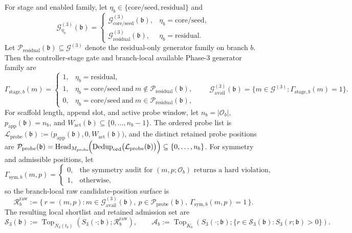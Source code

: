 \documentclass[11pt]{article}
\begin{document}
For stage and enabled family, let \(\eta_b\in\{\mathrm{core/seed},\mathrm{residual}\}\) and
\[
\mathcal G_{\eta_b}^{(3)}(\mathfrak b)=
\begin{cases}
\mathcal G_{\mathrm{core/seed}}^{(3)}(\mathfrak b),&\eta_b=\mathrm{core/seed},\\
\mathcal G_{\mathrm{residual}}^{(3)}(\mathfrak b),&\eta_b=\mathrm{residual}.
\end{cases}
\]
Let \(\mathcal P_{\mathrm{residual}}(\mathfrak b)\subseteq\mathcal G^{(3)}\) denote the residual-only generator family on branch \(b\). Then the controller-stage gate and branch-local available Phase-3 generator family are
\[
\Gamma_{\mathrm{stage},b}(m)=
\begin{cases}
1,&\eta_b=\mathrm{residual},\\
1,&\eta_b=\mathrm{core/seed}\ \text{and}\ m\notin\mathcal P_{\mathrm{residual}}(\mathfrak b),\\
0,&\eta_b=\mathrm{core/seed}\ \text{and}\ m\in\mathcal P_{\mathrm{residual}}(\mathfrak b),
\end{cases}
\qquad
\mathcal G_{\mathrm{avail}}^{(3)}(\mathfrak b)=\{m\in\mathcal G^{(3)}:\Gamma_{\mathrm{stage},b}(m)=1\}.
\]
For scaffold length, append slot, and active probe window, let \(n_b=|\mathcal O_b|\), \(p_{\mathrm{app}}(\mathfrak b)=n_b\), and \(W_{\mathrm{act}}(\mathfrak b)\subseteq\{0,\dots,n_b-1\}\). The ordered probe list is \(\mathcal L_{\mathrm{probe}}(\mathfrak b):=\bigl(p_{\mathrm{app}}(\mathfrak b),0,W_{\mathrm{act}}(\mathfrak b)\bigr)\), and the distinct retained probe positions are \(\mathcal P_{\mathrm{probe}}(\mathfrak b)=\operatorname{Head}_{M_{\mathrm{probe}}}\!\Bigl(\operatorname{Dedup}_{\mathrm{ord}}\bigl(\mathcal L_{\mathrm{probe}}(\mathfrak b)\bigr)\Bigr)\subseteq\{0,\dots,n_b\}\). For symmetry and admissible positions, let
\[
\Gamma_{\mathrm{sym},b}(m,p)=
\begin{cases}
0,&\text{the symmetry audit for }(m,p;\mathcal O_b)\text{ returns a hard violation},\\
1,&\text{otherwise},
\end{cases}
\]
so the branch-local raw candidate-position surface is
\[
\mathcal R_b^{\mathrm{raw}}
:=
\{\,r=(m,p):m\in\mathcal G_{\mathrm{avail}}^{(3)}(\mathfrak b),\ p\in\mathcal P_{\mathrm{probe}}(\mathfrak b),\ \Gamma_{\mathrm{sym},b}(m,p)=1\,\}.
\]
The resulting local shortlist and retained admission set are
\[
\mathcal S_3(\mathfrak b)
:=
\operatorname{Top}_{N_3(t_b)}\!\left(S_3(\cdot;\mathfrak b);\mathcal R_b^{\mathrm{raw}}\right),
\qquad
\mathcal A_b
:=
\operatorname{Top}_{K_b}\!\left(S_3(\cdot;\mathfrak b);\{r\in\mathcal S_3(\mathfrak b):S_3(r;\mathfrak b)>0\}\right).
\]
\end{document}
